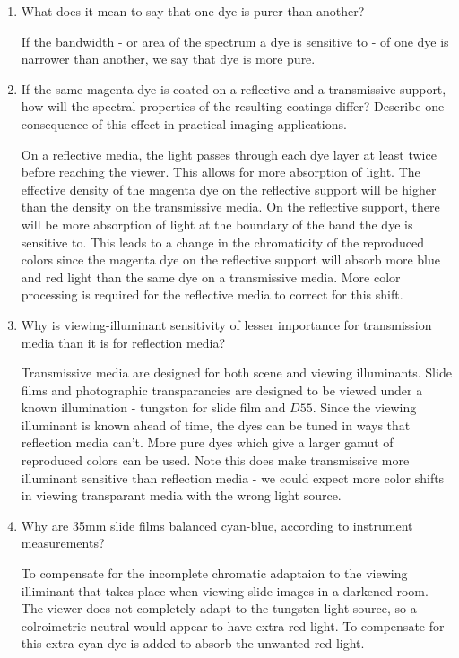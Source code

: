 \documentclass{amsart}
\theoremstyle{definition}
\theoremstyle{remark}
\numberwithin{equation}{section}
\begin{document}
\begin{enumerate}
\item  What does it mean to say that one dye is purer than
another?
\newline \par If the bandwidth - or area of the spectrum a dye is
sensitive to - of one dye is narrower than another, we say that
dye is more pure.
\newline

\item   If the same magenta dye is coated on a reflective and a
transmissive support, how will the spectral properties of the
resulting coatings differ? Describe one consequence of this effect
in practical imaging applications.
\newline \par On a reflective media, the light passes through each dye layer at least twice
before reaching the viewer.  This allows for more absorption of
light.  The effective density of the magenta dye on the reflective
support will be higher than the density on the transmissive media.
On the reflective support, there will be more absorption of light
at the boundary of the band the dye is sensitive to.  This leads
to a change in the chromaticity of the reproduced colors since the
magenta dye on the reflective support will absorb more blue and
red light than the same dye on a transmissive media.  More color
processing is required for the reflective media to correct for
this shift.
\newline

\item   Why is viewing-illuminant sensitivity of lesser importance
for transmission media than it is for reflection media?
\newline \par Transmissive media are designed for both scene and
viewing illuminants.  Slide films and photographic transparancies
are designed to be viewed under a known illumination - tungston
for slide film and $D{55}$. Since the viewing illuminant is known
ahead of time, the dyes can be tuned in ways that reflection media
can't. More pure dyes which give a larger gamut of reproduced
colors can be used.  Note this does make transmissive more
illuminant sensitive than reflection media - we could expect more
color shifts in viewing transparant media with the wrong light
source.
\newline

\item   Why are 35mm slide films balanced cyan-blue, according to
instrument measurements?
\newline \par To compensate for the incomplete chromatic adaptaion
to the viewing illiminant that takes place when viewing slide
images in a darkened room.  The viewer does not completely adapt
to the tungsten light source, so a colroimetric neutral would
appear to have extra red light.  To compensate for this extra cyan
dye is added to absorb the unwanted red light.
\newline


\end{enumerate}
\end{document}
